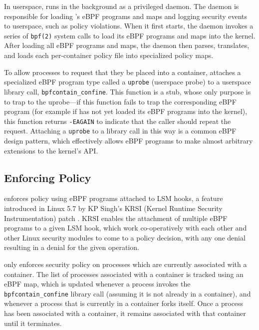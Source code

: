 
In userspace, \bpfcontain{} runs in the background as a privileged daemon.  The
daemon is responsible for loading \bpfcontain{}'s eBPF programs and maps and
logging security events to userspace, such as policy violations.  When it first
starts, the daemon invokes a series of \texttt{bpf(2)} system calls to load its
eBPF programs and maps into the kernel. After loading all eBPF programs and
maps, the daemon then parses, translates, and loads each per-container policy
file into specialized policy maps.

To allow processes to request that they be placed into a container,
\bpfcontain{} attaches a specialized eBPF program type called a \texttt{uprobe}
(userspace probe) to a userspace library call, \texttt{bpfcontain\_confine}.
This function is a stub, whose only purpose is to trap to the uprobe---if this
function fails to trap the corresponding eBPF program (for example if
\bpfcontain{} has not yet loaded its eBPF programs into the kernel), this
function returns \texttt{-EAGAIN} to indicate that the caller should repeat the
request. Attaching a \texttt{uprobe} to a library call in this way is a common
eBPF design pattern, which effectively allows eBPF programs to make almost
arbitrary extensions to the kernel's API.

\subsection{Enforcing Policy}
\label{subsection:enforcing}

\bpfcontain{} enforces policy using eBPF programs attached to LSM hooks,
a feature introduced in Linux 5.7 by KP Singh's KRSI (Kernel Runtime Security
Instrumentation) patch \cite{singh2019_krsi,corbet2019_krsi}. KRSI enables the
attachment of multiple eBPF programs to a given LSM hook, which work
co-operatively with each other and other Linux security modules to come to
a policy decision, with any one denial resulting in a denial for the given
operation.

\bpfcontain{} only enforces security policy on processes which are currently
associated with a container. The list of processes associated with a container
is tracked using an eBPF map, which is updated whenever a process invokes the
\texttt{bpfcontain\_confine} library call (assuming it is not already in
a container), and whenever a process that is currently in a container forks
itself. Once a process has been associated with a container, it remains
associated with that container until it terminates.

